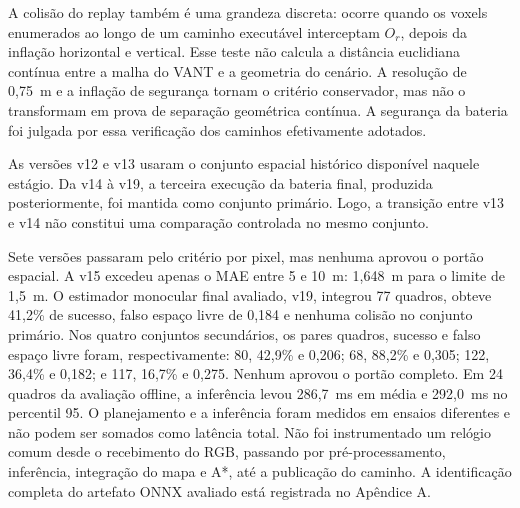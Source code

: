 \documentclass[article,a4paper,12pt,brazil,sumario=tradicional]{abntex2}
\begin{document}
A colisão do replay também é uma grandeza discreta: ocorre quando os voxels enumerados ao longo de um caminho executável interceptam $O_r$, depois da inflação horizontal e vertical. Esse teste não calcula a distância euclidiana contínua entre a malha do VANT e a geometria do cenário. A resolução de 0,75~m e a inflação de segurança tornam o critério conservador, mas não o transformam em prova de separação geométrica contínua. A segurança da bateria foi julgada por essa verificação dos caminhos efetivamente adotados.

\begin{table}[htb]
\centering
\caption{Resumo das versões monoculares no conjunto primário de cada portão.}
\label{tab:artigo-monocular}
\end{table}

As versões v12 e v13 usaram o conjunto espacial histórico disponível naquele estágio. Da v14 à v19, a terceira execução da bateria final, produzida posteriormente, foi mantida como conjunto primário. Logo, a transição entre v13 e v14 não constitui uma comparação controlada no mesmo conjunto.

Sete versões passaram pelo critério por pixel, mas nenhuma aprovou o portão espacial. A v15 excedeu apenas o MAE entre 5 e 10~m: 1,648~m para o limite de 1,5~m. O estimador monocular final avaliado, v19, integrou 77 quadros, obteve 41,2\% de sucesso, falso espaço livre de 0,184 e nenhuma colisão no conjunto primário. Nos quatro conjuntos secundários, os pares quadros, sucesso e falso espaço livre foram, respectivamente: 80, 42,9\% e 0,206; 68, 88,2\% e 0,305; 122, 36,4\% e 0,182; e 117, 16,7\% e 0,275. Nenhum aprovou o portão completo. Em 24 quadros da avaliação offline, a inferência levou 286,7~ms em média e 292,0~ms no percentil 95. O planejamento e a inferência foram medidos em ensaios diferentes e não podem ser somados como latência total. Não foi instrumentado um relógio comum desde o recebimento do RGB, passando por pré-processamento, inferência, integração do mapa e A*, até a publicação do caminho. A identificação completa do artefato ONNX avaliado está registrada no Apêndice A.
\end{document}
